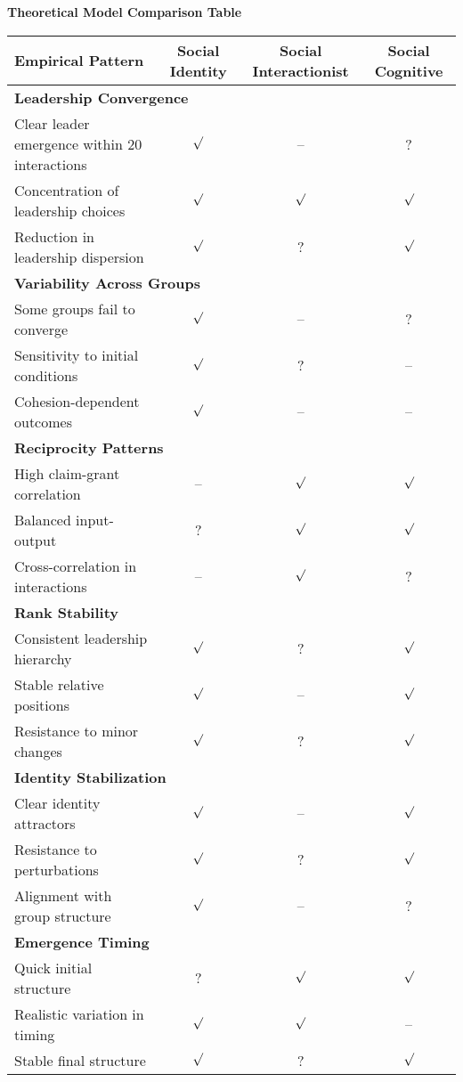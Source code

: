 \documentclass{article}
\begin{document}
\begin{center}
\Large\textbf{Theoretical Model Comparison Table}
\end{center}

\vspace{0.5cm}

\begin{table}[h!]
\centering
\begin{tabular}{p{6cm}ccc}
\toprule
\textbf{Empirical Pattern} & \textbf{Social Identity} & \textbf{Social Interactionist} & \textbf{Social Cognitive} \\
\midrule
\multicolumn{4}{l}{\textbf{Leadership Convergence}} \\
Clear leader emergence within 20 interactions & $\surd$ & -- & ? \\
Concentration of leadership choices & $\surd$ & $\surd$ & $\surd$ \\
Reduction in leadership dispersion & $\surd$ & ? & $\surd$ \\
\midrule
\multicolumn{4}{l}{\textbf{Variability Across Groups}} \\
Some groups fail to converge & $\surd$ & -- & ? \\
Sensitivity to initial conditions & $\surd$ & ? & -- \\
Cohesion-dependent outcomes & $\surd$ & -- & -- \\
\midrule
\multicolumn{4}{l}{\textbf{Reciprocity Patterns}} \\
High claim-grant correlation & -- & $\surd$ & $\surd$ \\
Balanced input-output & ? & $\surd$ & $\surd$ \\
Cross-correlation in interactions & -- & $\surd$ & ? \\
\midrule
\multicolumn{4}{l}{\textbf{Rank Stability}} \\
Consistent leadership hierarchy & $\surd$ & ? & $\surd$ \\
Stable relative positions & $\surd$ & -- & $\surd$ \\
Resistance to minor changes & $\surd$ & ? & $\surd$ \\
\midrule
\multicolumn{4}{l}{\textbf{Identity Stabilization}} \\
Clear identity attractors & $\surd$ & -- & $\surd$ \\
Resistance to perturbations & $\surd$ & ? & $\surd$ \\
Alignment with group structure & $\surd$ & -- & ? \\
\midrule
\multicolumn{4}{l}{\textbf{Emergence Timing}} \\
Quick initial structure & ? & $\surd$ & $\surd$ \\
Realistic variation in timing & $\surd$ & $\surd$ & -- \\
Stable final structure & $\surd$ & ? & $\surd$ \\
\bottomrule
\end{tabular}
\end{table}
\end{document}
